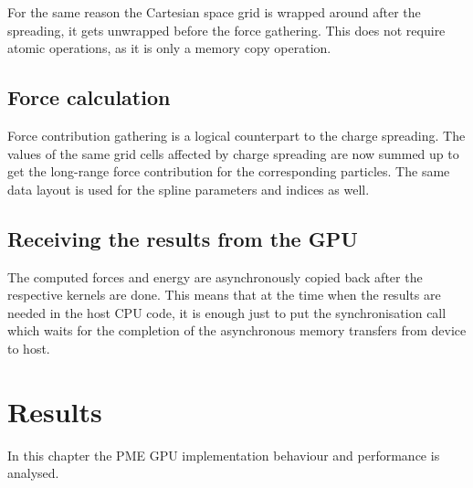 \documentclass[12pt,a4paper]{report}
\newcommand{\draft}[1]{#1}
\begin{document}
For the same reason the Cartesian space grid is wrapped around after the spreading, it gets unwrapped before the force gathering. This does not require atomic operations, as it is only a memory copy operation.

\section{Force calculation}
Force contribution gathering is a logical counterpart to the charge spreading. The values of the same grid cells affected by charge spreading are now summed up to get the long-range force contribution for the corresponding particles.
The same data layout is used for the spline parameters and indices as well.


\section{Receiving the results from the GPU}
The computed forces and energy are asynchronously copied back after the respective kernels are done. This means that at the time when the results are needed in the host CPU code, it is enough just to put the synchronisation call which waits for the completion of the asynchronous memory transfers from device to host.

\newpage
\chapter{Results}

In this chapter the PME GPU implementation behaviour and performance is analysed.

\end{document}
